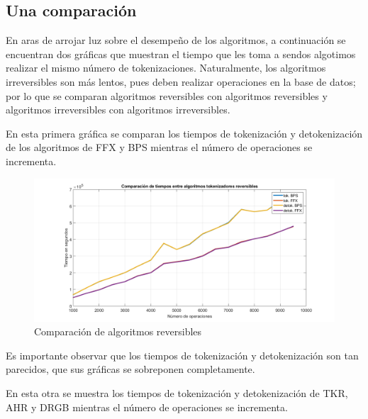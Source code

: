 %
%

\subsection{Una comparación}

En aras de arrojar luz sobre el desempeño de los algoritmos, a
continuación se encuentran dos gráficas que muestran el tiempo que les
toma a sendos algotimos realizar el mismo número de tokenizaciones.
Naturalmente, los algoritmos irreversibles son más lentos, pues deben
realizar operaciones en la base de datos; por lo que se comparan
algoritmos reversibles con algoritmos reversibles y algoritmos
irreversibles con algoritmos irreversibles.

En esta primera gráfica se comparan los tiempos de tokenización y
detokenización de los algoritmos de FFX y BPS mientras el número
de operaciones se incrementa.

\begin{figure}[H]
  \begin{center}
    \includegraphics[width=1\linewidth]{estaticos/imagenes/todo_rev.png}
    \caption{Comparación de algoritmos reversibles}
  \end{center}
\end{figure}

Es importante observar que los tiempos de tokenización y detokenización
son tan parecidos, que sus gráficas se sobreponen completamente.

En esta otra se muestra los tiempos de tokenización y detokenización de
TKR, AHR y DRGB mientras el número de operaciones se incrementa.

